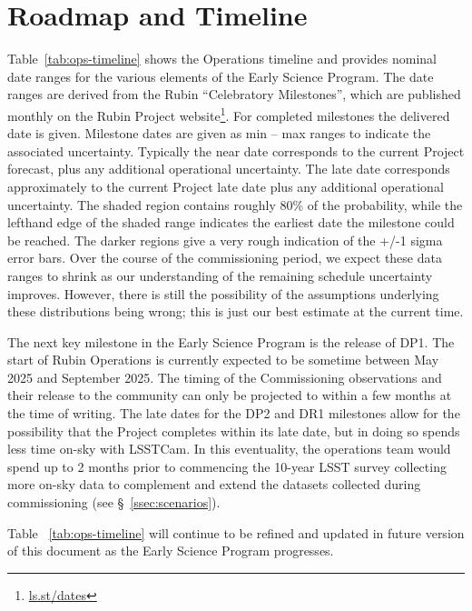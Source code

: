 \section{Roadmap and Timeline} \label{sec:timeline}

Table~\ref{tab:ops-timeline} shows the Operations timeline and provides nominal date ranges for the various elements of the Early Science Program.
The date ranges are derived from the Rubin ``Celebratory Milestones'', which are  published monthly on the Rubin Project website\footnote{\url{ls.st/dates}}. 
For completed milestones the delivered date is given. 
Milestone dates are given as min -- max ranges to indicate the associated uncertainty. 
Typically the near date corresponds to the current Project forecast, plus any additional operational uncertainty.
The late date corresponds approximately to the current Project late date plus any additional operational uncertainty.
The shaded region contains roughly 80\% of the probability, while the lefthand edge of the shaded range indicates the earliest date the milestone could be reached. 
The darker regions give a very rough indication of the +/-1 sigma error bars.
Over the course of the commissioning period, we expect these data ranges to shrink as our understanding of the remaining schedule uncertainty improves. 
However, there is still the possibility of the assumptions underlying these distributions being wrong; this is just our best estimate at the current time.



The next key milestone in the Early Science Program is the release of DP1.
The  start  of Rubin Operations is currently expected to be sometime between May 2025 and September 2025.
The timing of the Commissioning observations and their release to the community can only be projected to within a few months at the time of writing.
The late dates for the DP2 and DR1 milestones allow for the possibility that the Project completes within its late date, but in doing so spends less time on-sky with LSSTCam.
In this eventuality, the operations team would spend up to 2 months prior to commencing the 10-year LSST survey collecting more on-sky data to complement and extend the datasets collected during commissioning (see \S~\ref{ssec:scenarios}). 

Table ~\ref{tab:ops-timeline} will continue to be refined and updated in future version of this document as the Early Science Program progresses.